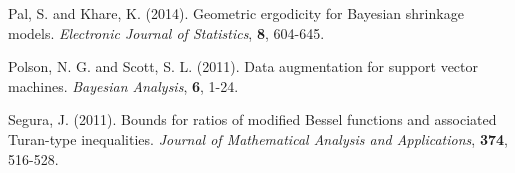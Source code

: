\documentclass[12pt]{article}
\begin{document}
\newpage

\begin{thebibliography}{9}
    Pal, S. and Khare, K. (2014). Geometric ergodicity for Bayesian shrinkage models. \emph{Electronic Journal of Statistics}, \textbf{8}, 604-645.

    Polson, N. G. and Scott, S. L. (2011). Data augmentation for support vector machines. \emph{Bayesian Analysis}, \textbf{6}, 1-24.

    Segura, J. (2011). Bounds for ratios of modified Bessel functions and associated Turan-type inequalities. \emph{Journal of Mathematical Analysis
    and Applications}, \textbf{374}, 516-528.
\end{thebibliography}
\end{document}
